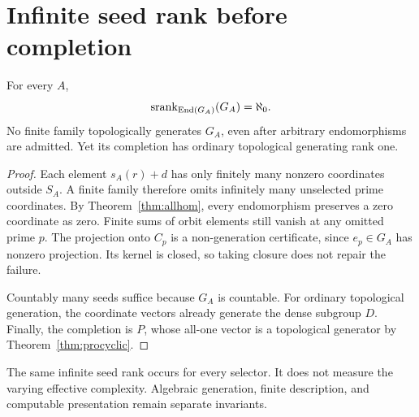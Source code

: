 \section{Infinite seed rank before completion}
\begin{theorem}
\label{thm:rankGA}
For every $A$,
\[
\operatorname{srank}_{\operatorname{End}(G_A)}(G_A)=\aleph_0.
\]
No finite family topologically generates $G_A$, even after arbitrary endomorphisms are admitted. Yet its completion has ordinary topological generating rank one.
\end{theorem}
\begin{proof}
Each element $s_A(r)+d$ has only finitely many nonzero coordinates outside $S_A$. A finite family therefore omits infinitely many unselected prime coordinates. By Theorem~\ref{thm:allhom}, every endomorphism preserves a zero coordinate as zero. Finite sums of orbit elements still vanish at any omitted prime $p$. The projection onto $C_p$ is a non-generation certificate, since $e_p\in G_A$ has nonzero projection. Its kernel is closed, so taking closure does not repair the failure.

Countably many seeds suffice because $G_A$ is countable. For ordinary topological generation, the coordinate vectors already generate the dense subgroup $D$. Finally, the completion is $P$, whose all-one vector is a topological generator by Theorem~\ref{thm:procyclic}.
\end{proof}
The same infinite seed rank occurs for every selector. It does not measure the varying effective complexity. Algebraic generation, finite description, and computable presentation remain separate invariants.
